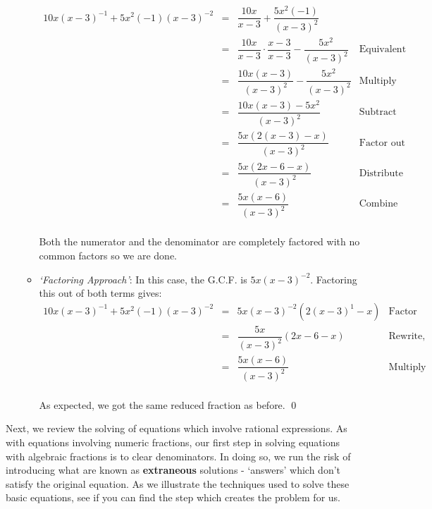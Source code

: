 \begin{ex}
\begin{enumerate}
\begin{itemize}
\[\begin{array}{rclr}
10x(x-3)^{-1} + 5x^2(-1)(x-3)^{-2} & = & \dfrac{10x}{x-3} + \dfrac{5x^2(-1)}{(x-3)^2} & \\ [10pt]
                                   & = & \dfrac{10x}{x-3} \cdot \dfrac{x-3}{x-3} - \dfrac{5x^2}{(x-3)^2} & \text{Equivalent Fractions} \\ [10pt]
																	 & = & \dfrac{10x(x-3)}{(x-3)^2} - \dfrac{5x^2}{(x-3)^2} & \text{Multiply} \\ [10pt]
																	 & = & \dfrac{10x(x-3) - 5x^2}{(x-3)^2} & \text{Subtract} \\ [10pt]
																	 & = & \dfrac{5x(2(x-3) - x)}{(x-3)^2} & \text{Factor out G.C.F.} \\ [10pt]
																	 & = & \dfrac{5x(2x-6-x)}{(x-3)^2} & \text{Distribute} \\ [10pt]
																	 & = & \dfrac{5x(x-6)}{(x-3)^2} & \text{Combine like terms} \\
																	
\end{array} \]

Both the numerator and the denominator are completely factored with no common factors so we are done.

\item  \textit{`Factoring Approach'}: In this case, the G.C.F. is $5x(x-3)^{-2}$.  Factoring this out of both terms gives: \[ \begin{array}{rclr}

10x(x-3)^{-1} + 5x^2(-1)(x-3)^{-2} & = & 5x(x-3)^{-2}(2(x-3)^{1} - x) & \text{Factor} \\ [8pt]
                                  & = & \dfrac{5x}{(x-3)^2} (2x-6 - x) & \text{Rewrite, distribute}\\ [12pt]
																	& = & \dfrac{5x(x-6)}{(x-3)^2} & \text{Multiply}\\ \end{array}\]

As expected, we got the same reduced fraction as before. \qed
\end{itemize}
																
\end{enumerate}

\end{ex}


Next, we review the solving of equations which involve rational expressions.  As with equations involving numeric fractions, our first step in solving equations with algebraic fractions is to clear denominators.  In doing so, we run the risk of introducing what are known as \textbf{extraneous} solutions - `answers' which don't satisfy the original equation.  As we illustrate the techniques used to solve these basic equations, see if you can find the step which creates the problem for us.

